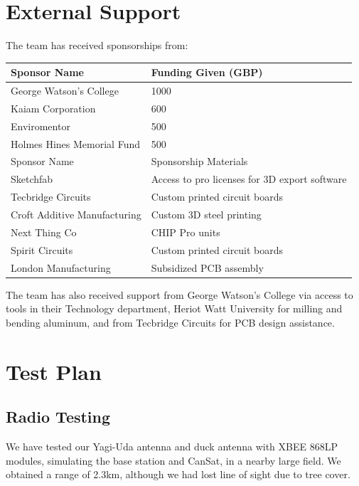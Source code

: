 \documentclass[]{report}
\begin{document}
\section{External Support}

The team has received sponsorships from:
\begin{center}
\begin{tabular}{ll}
	Sponsor Name                 & Funding Given (GBP)                           \\ \hline
	George Watson's College      & 1000                                          \\
	Kaiam Corporation            & 600                                           \\
	Enviromentor                & 500                                           \\
	Holmes Hines Memorial Fund   & 500                                           \\ \hline
	Sponsor Name                 & Sponsorship Materials                         \\ \hline
	Sketchfab                    & Access to pro licenses for 3D export software \\
	Tecbridge Circuits           & Custom printed circuit boards                 \\
	Croft Additive Manufacturing & Custom 3D steel printing                      \\
	Next Thing Co                & CHIP Pro units                                \\
	Spirit Circuits              & Custom printed circuit boards                 \\
	London Manufacturing         & Subsidized PCB assembly                       \\
                                           
\end{tabular}
\end{center}

The team has also received support from George Watson's College via access to tools in their Technology department, Heriot Watt University for milling and bending aluminum, and from Tecbridge Circuits for PCB design assistance.

\section{Test Plan}
\subsection{Radio Testing}
We have tested our Yagi-Uda antenna and duck antenna with XBEE 868LP modules, simulating the base station and CanSat, in a nearby large field.  We obtained a range of 2.3km, although we had lost line of sight due to tree cover.
\end{document}
